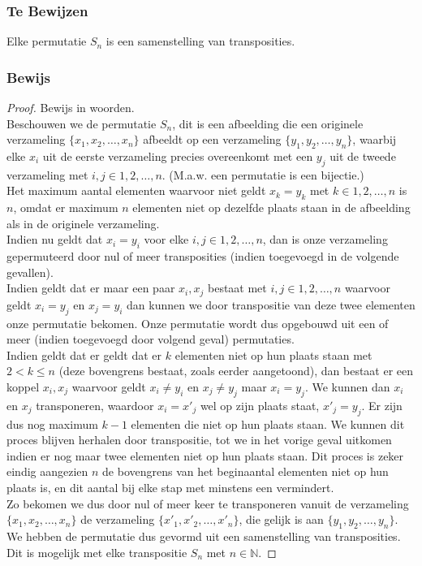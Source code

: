 \documentclass[lineaire_algebra_oplossingen.tex]{subfiles}
\begin{document}
\subsubsection*{Te Bewijzen}
Elke permutatie $S_n$ is een samenstelling van transposities.

\subsubsection*{Bewijs}
\begin{proof}
Bewijs in woorden.\\
Beschouwen we de permutatie $S_n$, dit is een afbeelding die een originele verzameling $\{x_1,x_2,\dotsc,x_n\}$ afbeeldt op een verzameling $\{y_1,y_2,\dotsc,y_n\}$, waarbij elke $x_i$ uit de eerste verzameling precies overeenkomt met een $y_j$ uit de tweede verzameling met $i,j \in {1,2,\dotsc,n}$. (M.a.w. een permutatie is een bijectie.)\\
Het maximum aantal elementen waarvoor niet geldt $x_k = y_k$ met $k \in {1,2,\dotsc,n}$ is $n$, omdat er maximum $n$ elementen niet op dezelfde plaats staan in de afbeelding als in de originele verzameling.\\
Indien nu geldt dat $x_i = y_i$ voor elke $i,j \in {1,2,\dotsc,n}$, dan is onze verzameling gepermuteerd door nul of meer transposities (indien toegevoegd in de volgende gevallen).\\
Indien geldt dat er maar een paar $x_i, x_j$ bestaat met $i,j \in {1,2,\dotsc,n}$ waarvoor geldt $x_i = y_j$ en $x_j = y_i$ dan kunnen we door transpositie van deze twee elementen onze permutatie bekomen. Onze permutatie wordt dus opgebouwd uit een of meer (indien toegevoegd door volgend geval) permutaties.\\
Indien geldt dat er geldt dat er $k$ elementen niet op hun plaats staan met $2 < k \leq n$ (deze bovengrens bestaat, zoals eerder aangetoond), dan bestaat er een koppel $x_i, x_j$ waarvoor geldt $x_i \neq y_i$ en $x_j \neq y_j$ maar $x_i = y_j$. We kunnen dan $x_i$ en $x_j$ transponeren, waardoor $x_i = x'_j$ wel op zijn plaats staat, $x'_j=y_j$. Er zijn dus nog maximum $k-1$ elementen die niet op hun plaats staan. We kunnen dit proces blijven herhalen door transpositie, tot we in het vorige geval uitkomen indien er nog maar twee elementen niet op hun plaats staan. Dit proces is zeker eindig aangezien $n$ de bovengrens van het beginaantal elementen niet op hun plaats is, en dit aantal bij elke stap met minstens een vermindert.\\
Zo bekomen we dus door nul of meer keer te transponeren vanuit de verzameling $\{x_1,x_2,\dotsc,x_n\}$ de verzameling $\{x'_1,x'_2,\dotsc,x'_n\}$, die gelijk is aan $\{y_1,y_2,\dotsc,y_n\}$. We hebben de permutatie dus gevormd uit een samenstelling van transposities. Dit is mogelijk met elke transpositie $S_n$ met $n \in \mathbb{N}$.
\end{proof}
\end{document}
